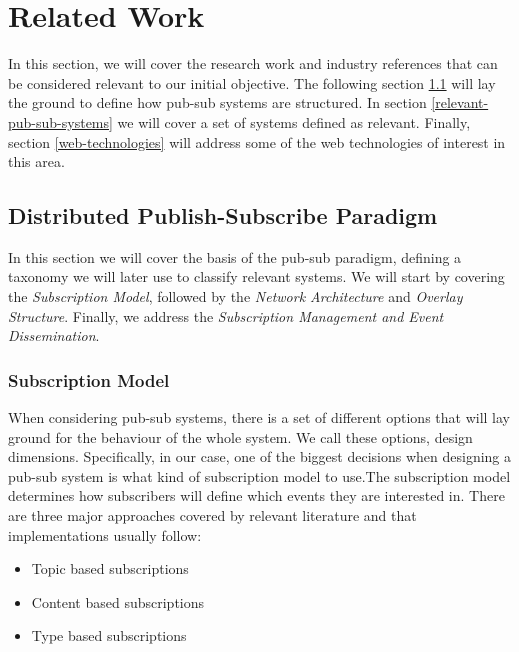 
\chapter{Related Work}
\label{chapter:related-work}

In this section, we will cover the research work and industry references that
can be considered relevant to our initial objective. The following section
\ref{distributed-publish-subscribe-paradigm} will lay the ground to define how
pub-sub systems are structured. In section \ref{relevant-pub-sub-systems} we
will cover a set of systems defined as relevant. Finally, section
\ref{web-technologies} will address some of the web technologies of interest in
this area.

\section{Distributed Publish-Subscribe
Paradigm}\label{distributed-publish-subscribe-paradigm}

In this section we will cover the basis of the pub-sub paradigm, defining a
taxonomy we will later use to classify relevant systems. We will start by
covering the \emph{Subscription Model}, followed by the \emph{Network
Architecture} and \emph{Overlay Structure}. Finally, we
address the \emph{Subscription Management and Event Dissemination}.

\subsection{Subscription Model}\label{subscription-model}

When considering pub-sub systems, there is a set of different options that will
lay ground for the behaviour of the whole system. We call these options, design
dimensions. Specifically, in our case, one of the biggest decisions when
designing a pub-sub system is what kind of subscription model to use.The
subscription model determines how subscribers will define which events they are
interested in. There are three major approaches covered by relevant literature
\cite{Kermarrec2013} \cite{Eugster2003} and that implementations usually
follow:

\begin{itemize}
  \item
    Topic based subscriptions
  \item
    Content based subscriptions
  \item
    Type based subscriptions
\end{itemize}

